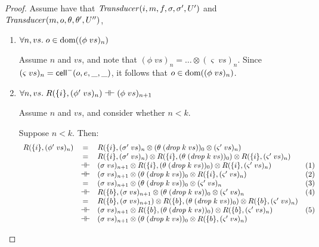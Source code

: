 \begin{proof}
Assume have that $\mathit{Transducer}(i, m, f, \sigma, \sigma', U')$ and $\mathit{Transducer}(m, o, \theta, \theta', U'')$, 
\begin{enumerate}
\item $\forall n, vs.\; o \in \mbox{dom}({(\phi\;vs)_n})$ 

  Assume $n$ and $vs$, and note that $(\phi\;vs)_n = \ldots \otimes (\varsigma\;vs)_n$. 
  Since $(\varsigma\;vs)_n = \mathsf{cell}^{-}({o}, {e}, {\_}, {\_})$, it follows that $o \in \mbox{dom}({(\phi\;vs)_n})$. 


\item $\forall n, vs.\; R(\{{i}\}, (\phi'\;vs)_n) \dashv\vdash (\phi\;vs)_{n+1}$

  Assume $n$ and $vs$, and consider whether $n < k$.

  Suppose $n < k$. Then:
  \begin{displaymath}
      \begin{array}{lcll}
        R(\{{i}\}, (\phi'\;vs)_n) 
        & = & R(\{{i}\}, (\sigma'\;vs)_n \otimes (\theta\;(\mathit{drop}\;k\;vs))_0 \otimes (\varsigma'\;vs)_n)
        & \\
        & = & R(\{{i}\}, (\sigma'\;vs)_n) \otimes R(\{{i}\}, (\theta\;(\mathit{drop}\;k\;vs))_0) \otimes  R(\{{i}\}, (\varsigma'\;vs)_n)
        & \\
        & \dashv\vdash & (\sigma\;vs)_{n+1} \otimes R(\{{i}\}, (\theta\;(\mathit{drop}\;k\;vs))_0) \otimes  R(\{{i}\}, (\varsigma'\;vs)_n)
        & (1) \\
        & \dashv\vdash & (\sigma\;vs)_{n+1} \otimes (\theta\;(\mathit{drop}\;k\;vs))_0 \otimes  R(\{{i}\}, (\varsigma'\;vs)_n)
        & (2) \\ 
        & = & (\sigma\;vs)_{n+1} \otimes (\theta\;(\mathit{drop}\;k\;vs))_0 \otimes (\varsigma'\;vs)_n
        & (3) \\ 
        & \dashv\vdash & R(\{{b}\}, (\sigma\;vs)_{n+1} \otimes (\theta\;(\mathit{drop}\;k\;vs))_0 \otimes (\varsigma'\;vs)_n
        & (4) \\ 
        & = & R(\{{b}\}, (\sigma\;vs)_{n+1}) \otimes R(\{{b}\}, (\theta\;(\mathit{drop}\;k\;vs))_0) \otimes R(\{{b}\}, (\varsigma'\;vs)_n)
        & \\ 
        & \dashv\vdash & (\sigma\;vs)_{n+1} \otimes R(\{{b}\}, (\theta\;(\mathit{drop}\;k\;vs))_0) \otimes R(\{{b}\}, (\varsigma'\;vs)_n)
        & (5) \\
        & \dashv\vdash & (\sigma\;vs)_{n+1} \otimes (\theta\;(\mathit{drop}\;k\;vs))_0 \otimes R(\{{b}\}, (\varsigma'\;vs)_n)

\end{array}
\end{displaymath}
\end{enumerate}
\end{proof}
